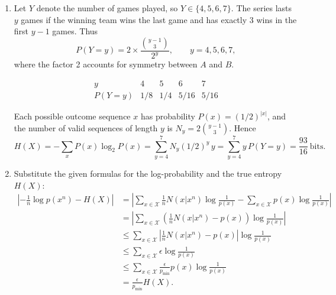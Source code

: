 \documentclass[12pt]{article}
\begin{document}
\begin{enumerate}
\begin{solution}
\begin{enumerate}[1)]
Now consider the Huffman tree corresponding to the above source. If we combine $a_1$ and $a_2$ in the first step, the code will have length functions: $l(a_1) = l(a_2) = 3$, $l(a_3) = 2$ and $l(a_4) = 1$. Now for $a_2$, the Shannon code length would be $\left\lceil \log_2 \frac{1}{\frac{1}{3} - \epsilon} \right\rceil = 2$, for $\epsilon < \frac{1}{12}$.

Thus, the binary Huffman codeword length can exceed the Shannon codeword length in general for a symbol.

\item 
Let \(Y\) denote the number of games played, so \(Y \in \{4,5,6,7\}\).  
The series lasts \(y\) games if the winning team wins the last game and has exactly 3 wins in the first \(y-1\) games.  
Thus
\[
P(Y=y) = 2 \times \frac{\binom{y-1}{3}}{2^y}, \qquad y=4,5,6,7,
\]
where the factor 2 accounts for symmetry between \(A\) and \(B\).

\[
\begin{array}{c|cccc}
y & 4 & 5 & 6 & 7 \\ \hline
P(Y=y) & 1/8 & 1/4 & 5/16 & 5/16
\end{array}
\]


Each possible outcome sequence \(x\) has probability \(P(x) = (1/2)^{|x|}\),  
and the number of valid sequences of length \(y\) is \(N_y = 2\binom{y-1}{3}\).  
Hence
\[
H(X) = -\sum_x P(x)\log_2 P(x)
     = \sum_{y=4}^{7} N_y (1/2)^y \, y
     = \sum_{y=4}^{7} y\,P(Y=y)
     = \frac{93}{16}~\text{bits.}
\]

\item 
Substitute the given formulas for the log-probability and the true entropy $H(X)$:
\begin{align*}
\left| -\frac{1}{n} \log p(x^n) - H(X) \right| 
&= \left| \sum_{x \in \mathcal{X}} \frac{1}{n} N(x|x^n)\log \frac{1}{p(x)} - \sum_{x \in \mathcal{X}} p(x) \log \frac{1}{p(x)} \right|\\
&= \left| \sum_{x \in \mathcal{X}} \left(\frac{1}{n} N(x|x^n) - p(x)\right)\log \frac{1}{p(x)}\right|\\
&\leq  \sum_{x \in \mathcal{X}} \left|\frac{1}{n} N(x|x^n) - p(x)\right|\log \frac{1}{p(x)}\\
&\leq  \sum_{x \in \mathcal{X}} \epsilon \log \frac{1}{p(x)}\\
&\leq  \sum_{x \in \mathcal{X}} \frac{\epsilon}{p_{\min}} p(x)\log \frac{1}{p(x)}\\
&= \frac{\epsilon}{p_{\min}} H(X).
\end{align*}
\end{enumerate}
\end{solution}




\end{enumerate}
\end{document}
